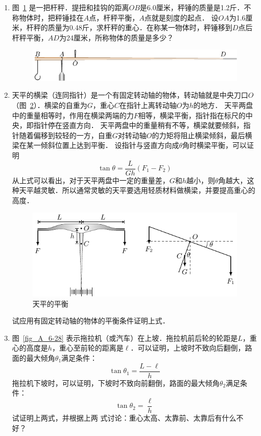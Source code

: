 \begin{enumerate}
\item  图~\ref{fig_A_6-26} 是一把杆秤．提扭和挂钩的距离$OB$是6.0厘米，秤锤的质量是1.2斤．不称物体时，把秤锤挂在$A$点，杆秤平衡，$A$点就是刻度的起点．
设$OA$为1.6厘米，杆秤的质量为0.48斤，求杆秤的重心．在称某一物体时，秤锤移到$D$点后杆秤平衡，$AD$为24厘米，所称物体的质量是多少？
\begin{figure}[htbp]
    \centering
    \includegraphics{fig/A/6-26.pdf}
    \caption{}\label{fig_A_6-26}
\end{figure}
\item 天平的横梁（连同指针）是一个有固定转动轴的物体，转动轴就是中央刀口$O$（图~\ref{fig_A_6-27}）．横梁的自重为$G$，重心$C$在指针上离转动轴$O$为$h$的地方．
天平两盘中的重量相等时，作用在横梁两端的力$F$相等，横梁平衡，指针指在标尺的中央，即指针停在竖直方向．
天平两盘中的重量稍有不等，横梁就要倾斜，指针随着偏移到较轻的一方，自重$G$对转动轴$O$的力矩将阻止横梁倾斜，最后横梁在某一倾斜位置上达到平衡．
设指针与竖直方向成$\theta$角时横梁平衡，可以证明
\[\tan\theta =\frac{L}{Gh}(F_1-F_2) \]
从上式可以看出，对于天平两盘中一定的重量差，$G$和$h$越小，则$\theta$角越大，这种天平越灵敏．所以通常灵敏的天平要选用轻质材料做横梁，并要提高重心的高度．
\begin{figure}[htbp]
    \centering
    \includegraphics{fig/A/6-27.pdf}
    \caption{天平的平衡}\label{fig_A_6-27}
\end{figure}
试应用有固定转动轴的物体的平衡条件证明上式．

\item  图~\ref{fig_A_6-28} 表示拖拉机（或汽车）在上坡．拖拉机前后轮的轮距是$L$，重心的高度是$h$，重心至前轮的距离是$\ell$．可以证明，上坡时不致向后翻倒，路面的最大倾角$\theta_1$满足条件：
\[\tan\theta_1=\frac{L-\ell}{h}\]
拖拉机下坡时，可以证明，下坡时不致向前翻倒，路面的最大倾角$\theta_2$满足条件：
\[\tan\theta_2=\frac{\ell}{h}\]
试证明上两式，并根据上两
式讨论：重心太高、太靠前、太靠后有什么不好？



\end{enumerate}
